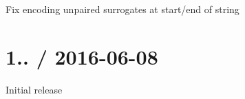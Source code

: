 
\begin{DoxyItemize}
\item Fix encoding unpaired surrogates at start/end of string
\end{DoxyItemize}

\section*{1.. / 2016-\/06-\/08 }


\begin{DoxyItemize}
\item Initial release 
\end{DoxyItemize}
